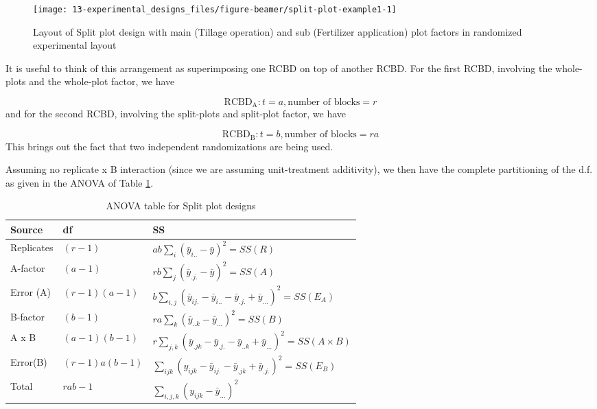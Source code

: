 \documentclass[
  ignorenonframetext,
  aspectratio=169]{beamer}
\begin{document}
\begin{frame}{}
\protect\hypertarget{section-13}{}
\begin{figure}
\texttt{[image: 13-experimental\_designs\_files/figure-beamer/split-plot-example1-1]} \caption{Layout of Split plot design with main (Tillage operation) and sub (Fertilizer application) plot factors in randomized experimental layout}\label{fig:split-plot-example1}
\end{figure}
\end{frame}

\begin{frame}{}
\protect\hypertarget{section-14}{}
\small

It is useful to think of this arrangement as superimposing one RCBD on
top of another RCBD. For the first RCBD, involving the whole-plots and
the whole-plot factor, we have

\[
\mathrm{RCBD_A}: t = a, \text{number of blocks} = r
\] and for the second RCBD, involving the split-plots and split-plot
factor, we have

\[
\mathrm{RCBD_B}: t = b, \text{number of blocks} = ra
\] This brings out the fact that two independent randomizations are
being used.
\end{frame}

\begin{frame}{}
\protect\hypertarget{section-15}{}
\small

Assuming no replicate x B interaction (since we are assuming
unit-treatment additivity), we then have the complete partitioning of
the d.f. as given in the ANOVA of Table \ref{tab:anova-split-plot}.

\begingroup\fontsize{8}{10}\selectfont

\begin{longtable}[t]{lll}
\caption{\label{tab:anova-split-plot}ANOVA table for Split plot designs}\\
\toprule
Source & df & SS\\
\midrule
Replicates & $(r-1)$ & $ab \sum_i{(\bar{y}_{i..} - \bar{y})^2} = SS(R)$\\
A-factor & $(a-1)$ & $rb \sum_j{(\bar{y}_{.j.} - \bar{y})^2} = SS(A)$\\
Error (A) & $(r-1)(a-1)$ & $b \sum_{i, j}{(\bar{y}_{ij.}- \bar{y}_{i..}- \bar{y}_{.j.}+ \bar{y}_{...})^2} = SS(E_A)$\\
B-factor & $(b-1)$ & $ra \sum_k{(\bar{y}_{..k} - \bar{y}_{...})^2} = SS(B)$\\
A x B & $(a-1)(b-1)$ & $r \sum_{j, k}{(\bar{y}_{.jk}- \bar{y}_{.j.}- \bar{y}_{..k}+ \bar{y}_{...})^2} = SS(A \times B)$\\
\addlinespace
Error(B) & $(r-1)a(b-1)$ & $\sum_{ijk}{(y_{ijk} - \bar{y}_{ij.} - \bar{y}_{.jk} + \bar{y}_{.j.})^2} = SS(E_B)$\\
Total & $rab-1$ & $\sum_{i,j,k}{(y_{ijk} - \bar{y}_{...})^2}$\\
\bottomrule
\end{longtable}
\endgroup{}
\end{frame}
\end{document}
